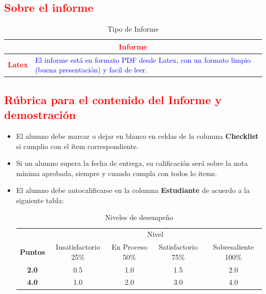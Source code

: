 \documentclass{article}
\begin{document}
	\subsection{\textcolor{red}{Sobre el informe}}
	\begin{table}[H]
		\caption{Tipo de Informe}
		\setlength{\tabcolsep}{0.5em} %
		{\renewcommand{\arraystretch}{1.5}%
		\begin{tabular}{|p{3cm}|p{12cm}|}
			\hline
			\multicolumn{2}{|c|}{\textbf{\textcolor{red}{Informe}}}  \\
			\hline 
			\textbf{\textcolor{red}{Latex}} & \textcolor{blue}{El informe está en formato PDF desde Latex,  con un formato limpio (buena presentación) y facil de leer.}   \\ 
			\hline 
			
			
		\end{tabular}
	}
	\end{table}
	
	\clearpage

	\subsection{\textcolor{red}{Rúbrica para el contenido del Informe y demostración}}
	\begin{itemize}			
		\item El alumno debe marcar o dejar en blanco en celdas de la columna \textbf{Checklist} si cumplio con el ítem correspondiente.
		\item Si un alumno supera la fecha de entrega,  su calificación será sobre la nota mínima aprobada, siempre y cuando cumpla con todos lo items.
		\item El alumno debe autocalificarse en la columna \textbf{Estudiante} de acuerdo a la siguiente tabla:
	
		\begin{table}[ht]
			\caption{Niveles de desempeño}
			\begin{center}
			\begin{tabular}{ccccc}
    			\hline
    			 & \multicolumn{4}{c}{Nivel}\\
    			\cline{1-5}
    			\textbf{Puntos} & Insatisfactorio 25\%& En Proceso 50\% & Satisfactorio 75\% & Sobresaliente 100\%\\
    			\textbf{2.0}&0.5&1.0&1.5&2.0\\
    			\textbf{4.0}&1.0&2.0&3.0&4.0\\
    		\hline
			\end{tabular}
		\end{center}
	\end{table}	
	
	\end{itemize}
	
\end{document}
